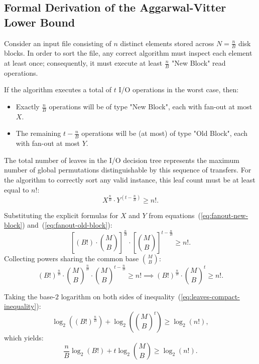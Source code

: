 \subsection{Formal Derivation of the Aggarwal-Vitter Lower Bound}
\label{subsec:formal-derivation-av}

Consider an input file consisting of $n$ distinct elements stored across $N = \frac{n}{B}$ disk blocks. In order to sort the file, any correct algorithm must inspect each element at least once; consequently, it must execute at least $\frac{n}{B}$ "New Block" read operations.

If the algorithm executes a total of $t$ I/O operations in the worst case, then:
\begin{itemize}
  \item Exactly $\frac{n}{B}$ operations will be of type "New Block", each with fan-out at most $X$.
  \item The remaining $t - \frac{n}{B}$ operations will be (at most) of type "Old Block", each with fan-out at most $Y$.
\end{itemize}

The total number of leaves in the I/O decision tree represents the maximum number of global permutations distinguishable by this sequence of transfers. For the algorithm to correctly sort any valid instance, this leaf count must be at least equal to $n!$:
\begin{equation}
  X^{\frac{n}{B}} \cdot Y^{\left(t - \frac{n}{B}\right)} \ge n!.
  \label{eq:io-tree-leaves-inequality}
\end{equation}

Substituting the explicit formulas for $X$ and $Y$ from equations~(\ref{eq:fanout-new-block}) and~(\ref{eq:fanout-old-block}):
\begin{equation}
  \left[ (B!) \cdot \binom{M}{B} \right]^{\frac{n}{B}} \cdot \left[ \binom{M}{B} \right]^{t - \frac{n}{B}} \ge n!.
\end{equation}
Collecting powers sharing the common base $\binom{M}{B}$:
\begin{equation}
  (B!)^{\frac{n}{B}} \cdot \binom{M}{B}^{\frac{n}{B}} \cdot \binom{M}{B}^{t - \frac{n}{B}} \ge n! \implies (B!)^{\frac{n}{B}} \cdot \binom{M}{B}^t \ge n!.
  \label{eq:leaves-compact-inequality}
\end{equation}

Taking the base-$2$ logarithm on both sides of inequality~(\ref{eq:leaves-compact-inequality}):
\begin{equation}
  \log_2\left((B!)^{\frac{n}{B}}\right) + \log_2\left(\binom{M}{B}^t\right) \ge \log_2(n!),
\end{equation}
which yields:
\begin{equation}
  \frac{n}{B} \log_2(B!) + t \log_2\binom{M}{B} \ge \log_2(n!).
  \label{eq:log-leaves-inequality}
\end{equation}

